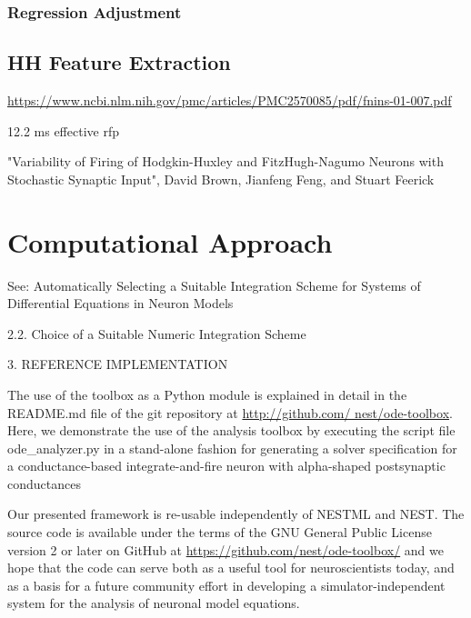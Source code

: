 \subsection{Regression Adjustment}\label{sec:reg_adjust}

\section{HH Feature Extraction}\label{sec:hh_feature_extract}

\url{https://www.ncbi.nlm.nih.gov/pmc/articles/PMC2570085/pdf/fnins-01-007.pdf}



12.2 ms effective rfp

"Variability of Firing of Hodgkin-Huxley and FitzHugh-Nagumo Neurons with Stochastic Synaptic Input", David Brown, Jianfeng Feng, and Stuart Feerick 

\chapter{Computational Approach}\label{chap:computational}

See: Automatically Selecting a Suitable Integration Scheme for Systems of Differential Equations in Neuron Models

2.2. Choice of a Suitable Numeric Integration Scheme

3. REFERENCE IMPLEMENTATION

The use of the toolbox as a Python module is explained in detail in the README.md file of the git repository at \url{http://github.com/ nest/ode-toolbox}. Here, we demonstrate the use of the analysis toolbox by executing the script file ode\_analyzer.py in a stand-alone fashion for generating a solver specification for a conductance-based integrate-and-fire neuron with alpha-shaped postsynaptic conductances


Our presented framework is re-usable independently of NESTML and NEST. The source code is available under the terms of the GNU General Public License version 2 or later on GitHub at \url{https://github.com/nest/ode-toolbox/} and we hope that the code can serve both as a useful tool for neuroscientists today, and as a basis for a future community effort in developing a simulator-independent system for the analysis of neuronal model equations.


